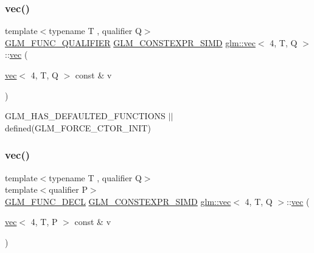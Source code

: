\subsubsection{\texorpdfstring{vec()}{vec()}\hspace{0.1cm}{\footnotesize\ttfamily [2/34]}}
{\footnotesize\ttfamily template$<$typename T , qualifier Q$>$ \\
\mbox{\hyperlink{setup_8hpp_a33fdea6f91c5f834105f7415e2a64407}{G\+L\+M\+\_\+\+F\+U\+N\+C\+\_\+\+Q\+U\+A\+L\+I\+F\+I\+ER}} \mbox{\hyperlink{setup_8hpp_ae5de828d10226b21e2123dd61f3cb5ed}{G\+L\+M\+\_\+\+C\+O\+N\+S\+T\+E\+X\+P\+R\+\_\+\+S\+I\+MD}} \mbox{\hyperlink{structglm_1_1vec}{glm\+::vec}}$<$ 4, T, Q $>$\+::\mbox{\hyperlink{structglm_1_1vec}{vec}} (\begin{DoxyParamCaption}\item[{\mbox{\hyperlink{structglm_1_1vec}{vec}}$<$ 4, T, Q $>$ const \&}]{v }\end{DoxyParamCaption})}



G\+L\+M\+\_\+\+H\+A\+S\+\_\+\+D\+E\+F\+A\+U\+L\+T\+E\+D\+\_\+\+F\+U\+N\+C\+T\+I\+O\+NS $\vert$$\vert$ defined(\+G\+L\+M\+\_\+\+F\+O\+R\+C\+E\+\_\+\+C\+T\+O\+R\+\_\+\+I\+N\+I\+T) 

\mbox{\label{structglm_1_1vec_3_014_00_01_t_00_01_q_01_4_a7f8d760e50fc7fb597c88ee4bf5bbcc2}} 
\subsubsection{\texorpdfstring{vec()}{vec()}\hspace{0.1cm}{\footnotesize\ttfamily [3/34]}}
{\footnotesize\ttfamily template$<$typename T , qualifier Q$>$ \\
template$<$qualifier P$>$ \\
\mbox{\hyperlink{setup_8hpp_ab2d052de21a70539923e9bcbf6e83a51}{G\+L\+M\+\_\+\+F\+U\+N\+C\+\_\+\+D\+E\+CL}} \mbox{\hyperlink{setup_8hpp_ae5de828d10226b21e2123dd61f3cb5ed}{G\+L\+M\+\_\+\+C\+O\+N\+S\+T\+E\+X\+P\+R\+\_\+\+S\+I\+MD}} \mbox{\hyperlink{structglm_1_1vec}{glm\+::vec}}$<$ 4, T, Q $>$\+::\mbox{\hyperlink{structglm_1_1vec}{vec}} (\begin{DoxyParamCaption}\item[{\mbox{\hyperlink{structglm_1_1vec}{vec}}$<$ 4, T, P $>$ const \&}]{v }\end{DoxyParamCaption})}


